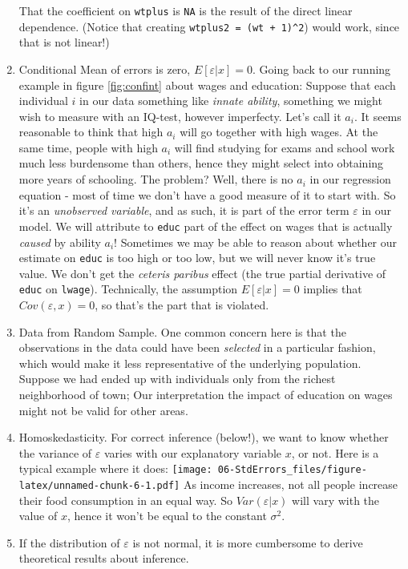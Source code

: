 \documentclass[]{book}
\begin{document}
\begin{enumerate}
  That the coefficient on \texttt{wtplus} is \texttt{NA} is the result
  of the direct linear dependence. (Notice that creating
  \texttt{wtplus2\ =\ (wt\ +\ 1)\^{}2}) would work, since that is not
  linear!)
\item
  Conditional Mean of errors is zero, \(E[\varepsilon|x] = 0\). Going
  back to our running example in figure \ref{fig:confint} about wages
  and education: Suppose that each individual \(i\) in our data
  something like \emph{innate ability}, something we might wish to
  measure with an IQ-test, however imperfecty. Let's call it \(a_i\). It
  seems reasonable to think that high \(a_i\) will go together with high
  wages. At the same time, people with high \(a_i\) will find studying
  for exams and school work much less burdensome than others, hence they
  might select into obtaining more years of schooling. The problem?
  Well, there is no \(a_i\) in our regression equation - most of time we
  don't have a good measure of it to start with. So it's an
  \emph{unobserved variable}, and as such, it is part of the error term
  \(\varepsilon\) in our model. We will attribute to \texttt{educ} part
  of the effect on wages that is actually \emph{caused} by ability
  \(a_i\)! Sometimes we may be able to reason about whether our estimate
  on \texttt{educ} is too high or too low, but we will never know it's
  true value. We don't get the \emph{ceteris paribus} effect (the true
  partial derivative of \texttt{educ} on \texttt{lwage}). Technically,
  the assumption \(E[\varepsilon|x] = 0\) implies that
  \(Cov(\varepsilon,x) = 0\), so that's the part that is violated.
\item
  Data from Random Sample. One common concern here is that the
  observations in the data could have been \emph{selected} in a
  particular fashion, which would make it less representative of the
  underlying population. Suppose we had ended up with individuals only
  from the richest neighborhood of town; Our interpretation the impact
  of education on wages might not be valid for other areas.
\item
  Homoskedasticity. For correct inference (below!), we want to know
  whether the variance of \(\varepsilon\) varies with our explanatory
  variable \(x\), or not. Here is a typical example where it does:
  \texttt{[image: 06-StdErrors\_files/figure-latex/unnamed-chunk-6-1.pdf]}
  As income increases, not all people increase their food consumption in
  an equal way. So \(Var(\varepsilon|x)\) will vary with the value of
  \(x\), hence it won't be equal to the constant \(\sigma^2\).
\item
  If the distribution of \(\varepsilon\) is not normal, it is more
  cumbersome to derive theoretical results about inference.
\end{enumerate}
\end{document}
